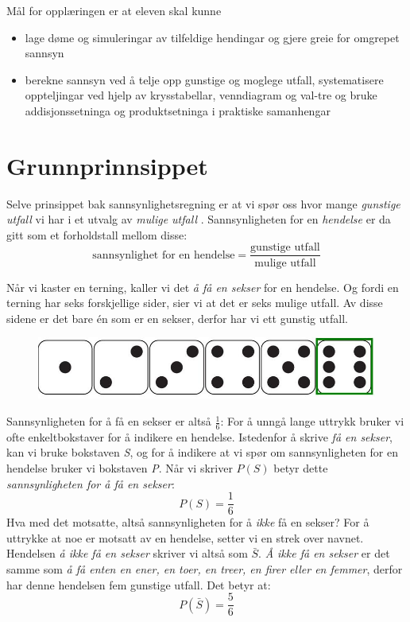 

%


Mål for opplæringen er at eleven skal kunne
\begin{itemize}
\item lage døme og simuleringar av tilfeldige hendingar og gjere greie for omgrepet sannsyn
\item berekne sannsyn ved å telje opp gunstige og moglege utfall, systematisere oppteljingar ved hjelp av krysstabellar, venndiagram og val-tre og bruke addisjonssetninga og produktsetninga i praktiske samanhengar
\end{itemize}

\newpage
\section{Grunnprinnsippet}
\setlength\itemsep{0 pt}
Selve prinsippet bak sannsynlighetsregning er at vi spør oss hvor mange \textit{gunstige utfall}  vi har i et utvalg av \textit{mulige utfall} . Sannsynligheten for en \textit{hendelse} er da gitt som et forholdstall mellom disse:
$$\text{sannsynlighet for en hendelse}=\frac{\text{gunstige utfall}}{\text{mulige utfall}}$$

Når vi kaster en terning, kaller vi det \textit{å få en sekser} for en hendelse. Og fordi en terning har seks forskjellige sider, sier vi at det er seks mulige utfall. Av disse sidene er det bare én som er en sekser, derfor har vi ett gunstig utfall. 
\begin{figure}[H]
	\centering
	\includegraphics[scale=0.3]{tern}
\end{figure}Sannsynligheten for å få en sekser er altså $ \frac{1}{6} $:
For å unngå lange uttrykk bruker vi ofte enkeltbokstaver for å indikere en hendelse. Istedenfor å skrive \textit{få en sekser}, kan vi bruke bokstaven \textit{S}, og for å indikere at vi spør om sannsynligheten for en hendelse bruker vi bokstaven \textit{P}. Når vi skriver $P(S)$ betyr dette \textit{sannsynligheten for å få en sekser}:
\[ P(S)=\frac{1}{6} \]
Hva med det motsatte, altså sannsynligheten for å \textsl{ikke} få en sekser? For å uttrykke at noe er motsatt av en hendelse, setter vi en strek over navnet. Hendelsen \textit{å ikke få en sekser} skriver vi altså som $ \bar{S} $. \textit{Å ikke få en sekser} er det samme som \textit{å få enten en ener, en toer, en treer, en firer eller en femmer}, derfor har denne hendelsen fem gunstige utfall. Det betyr at:
\[ P(\bar{S})=\frac{5}{6} \]

